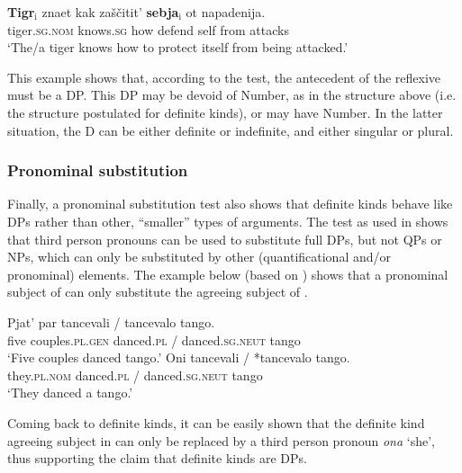 \documentclass[output=paper
,modfonts
,nonflat]{langsci/langscibook}
\begin{document}
	\ea\label{ex:borik:19}
	\gll \textbf{Tigr}\textnormal{$_\text{i}$} znaet 	kak za\v{s}\v{c}itit' 	\textbf{sebja}\textnormal{$_\text{i}$} ot napadenija.\\
	tiger.\textsc{sg.nom} knows.\textsc{sg} how defend self from attacks\\
	\glt `The/a tiger knows how to protect itself from being attacked.'
	\z
	
	This example shows that, according to the test, the antecedent of the reflexive must be a DP. This DP may be devoid of Number, as in the structure  above (i.e. the structure postulated for definite kinds), or may have Number. In the latter situation, the D can be either definite or indefinite, and either singular or plural. 
	
	\subsubsection{Pronominal substitution}
	
	Finally, a pronominal substitution test also shows that definite kinds behave like DPs rather than other, ``smaller'' types of arguments. The test as used in \citet{Pereltsvaig2006} shows that third person pronouns can be used to substitute full DPs, but not QPs or NPs, which can only be substituted by other (quantificational and/or pronominal) elements. The example below (based on \citealt[446, ex. 15a]{Pereltsvaig2006}) shows that a pronominal subject of  can only substitute the agreeing subject of . 
	
	\ea\label{ex:borik:20}
	\ea\label{ex:borik:20a}
	\gll Pjat' par tancevali \textnormal{/} tancevalo tango.\\
	five 	couples.\textsc{pl.gen} danced.\textsc{pl} \textnormal{/} danced.\textsc{sg.neut} 	tango\\
	\glt `Five couples danced tango.'
	\ex\label{ex:borik:20b}
	\gll Oni tancevali \textnormal{/} \textnormal{*}tancevalo tango.\\
	they.\textsc{pl.nom} danced.\textsc{pl} \textnormal{/} \phantom{*}danced.\textsc{sg.neut} 	tango\\
	\glt `They danced a tango.'
	\z
	\z
	
	Coming back to definite kinds, it can be easily shown that the definite kind agreeing subject in  can only be replaced by a third person pronoun \textit{ona} `she', thus supporting the claim that definite kinds are DPs.
	
\end{document}
